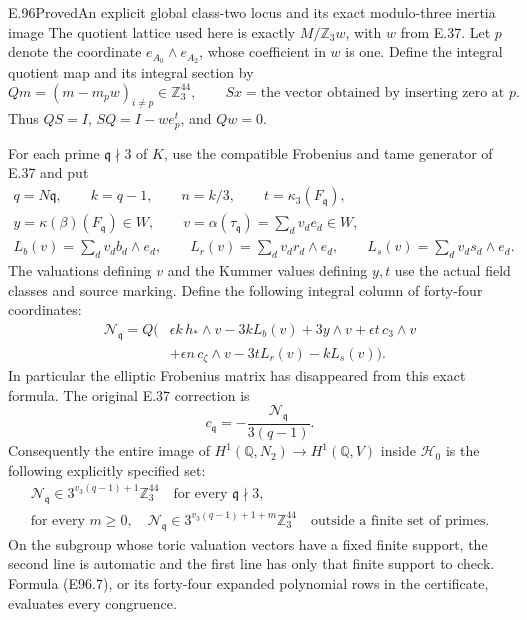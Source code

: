 \begin{statement}{E.96}{Proved}{An explicit global class-two locus and its exact modulo-three inertia image}
The quotient lattice used here is exactly $M/\mathbb Z_3w$,
with $w$ from E.37. Let $p$ denote the coordinate
$e_{A_0}\wedge e_{A_2}$, whose coefficient in $w$ is one.
Define the integral quotient map and its integral section by
\[
 Qm=(m-m_pw)_{i\ne p}\in\mathbb Z_3^{44},\qquad
 Sx=\text{the vector obtained by inserting zero at }p.
 \tag{E96.5}
\]
Thus $QS=I$, $SQ=I-we_p^t$, and $Qw=0$.

For each prime $\mathfrak q\nmid3$ of $K$, use the compatible
Frobenius and tame generator of E.37 and put
\[
 \begin{gathered}
 q=N\mathfrak q,\qquad k=q-1,\qquad n=k/3,\qquad
 t=\kappa_3(F_{\mathfrak q}),\\
 y=\kappa(\beta)(F_{\mathfrak q})\in W,\qquad
 v=\alpha(\tau_{\mathfrak q})
     =\sum_dv_de_d\in W,\\
 L_b(v)=\sum_dv_db_d\wedge e_d,\qquad
 L_r(v)=\sum_dv_dr_d\wedge e_d,\qquad
 L_s(v)=\sum_dv_ds_d\wedge e_d.
 \end{gathered}
 \tag{E96.6}
\]
The valuations defining $v$ and the Kummer values defining $y,t$
use the actual field classes and source marking. Define the
following integral column of forty-four coordinates:
\[
 \begin{split}
 \mathcal N_{\mathfrak q}=Q\bigl(&
   \epsilon k\,h_*\wedge v-3kL_b(v)+3y\wedge v
        +\epsilon t\,c_3\wedge v\\
   &+\epsilon n\,c_\zeta\wedge v
        -3tL_r(v)-kL_s(v)\bigr).
 \end{split}
 \tag{E96.7}
\]
In particular the elliptic Frobenius matrix has disappeared
from this exact formula. The original E.37 correction is
\[
 c_{\mathfrak q}=-\frac{\mathcal N_{\mathfrak q}}{3(q-1)}.
 \tag{E96.8}
\]
Consequently the entire image of
$H^1(\mathbb Q,N_2)\to H^1(\mathbb Q,V)$ inside
$\mathcal H_0$ is the following explicitly specified set:
\[
 \begin{gathered}
 \mathcal N_{\mathfrak q}\in
       3^{v_3(q-1)+1}\mathbb Z_3^{44}\quad
                         \text{for every }\mathfrak q\nmid3,\\
 \text{for every }m\ge0,\quad
 \mathcal N_{\mathfrak q}\in
       3^{v_3(q-1)+1+m}\mathbb Z_3^{44}\quad
                         \text{outside a finite set of primes.}
 \end{gathered}
 \tag{E96.9}
\]
On the subgroup whose toric valuation vectors have a fixed finite
support, the second line is automatic and the first line has
only that finite support to check. Formula (E96.7), or its
forty-four expanded polynomial rows in the certificate,
evaluates every congruence.


\end{statement}
